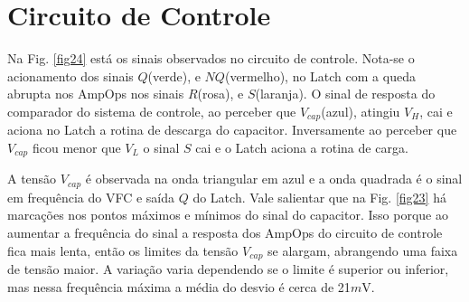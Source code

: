 \section{Circuito de Controle}

Na Fig. \ref{fig24} está os sinais observados no circuito de controle. Nota-se o acionamento dos sinais $Q$(verde), e $NQ$(vermelho), no Latch com a queda abrupta nos AmpOps nos sinais $R$(rosa), e $S$(laranja). O sinal de resposta do comparador do sistema de controle, ao perceber que $V_{cap}$(azul), atingiu $V_H$, cai e aciona no Latch a rotina de descarga do capacitor. Inversamente ao perceber que $V_{cap}$ ficou menor que $V_L$ o sinal $S$ cai e o Latch aciona a rotina de carga.

A tensão $V_{cap}$ é observada na onda triangular em azul e a onda quadrada é o sinal em frequência do VFC e saída $Q$ do Latch.
Vale salientar que na Fig. \ref{fig23} há marcações nos pontos máximos e mínimos do sinal do capacitor. Isso porque ao aumentar a frequência do sinal a resposta dos AmpOps do circuito de controle fica mais lenta, então os limites da tensão $V_{cap}$ se alargam, abrangendo uma faixa de tensão maior. A variação varia dependendo se o limite é superior ou inferior, mas nessa frequência máxima a média do desvio é cerca de 21$m$V.  

